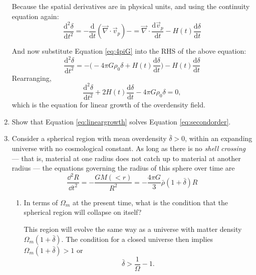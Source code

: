\begin{enumerate}
\begin{answer}
Because the spatial derivatives are in physical units, and using the
continuity equation again:
\begin{equation}
\frac{\mathrm{d}^2\delta}{\mathrm{d} t^2} =
- \frac{\mathrm{d}}{\mathrm{d}t} \left(\vec{\nabla} \cdot \vec{v}_p\right)
- = \vec{\nabla} \cdot \frac{\mathrm{d}\vec{v}_p}{\mathrm{d} t} - H(t) \frac{\mathrm{d}\delta}{\mathrm{d} t} 
\end{equation}

And now substitute Equation \ref{eq:4piG} into the RHS of the above equation:
\begin{equation}
\frac{\mathrm{d}^2\delta}{\mathrm{d} t^2} = -\Bigg(-4\pi G \rho_0 \delta + H(t) \frac{\mathrm{d}\delta}{\mathrm{d} t}\Bigg) - H(t) \frac{\mathrm{d}\delta}{\mathrm{d} t} 
\end{equation}
Rearranging,
\begin{equation}
\frac{\mathrm{d}^2\delta}{\mathrm{d} t^2} +
2H(t) \frac{\mathrm{d}\delta}{\mathrm{d} t} - 4\pi G \rho_0 \delta =
0,
\end{equation}
which is the equation for linear growth of the overdensity field.
\end{answer}

\item Show that Equation \ref{eq:lineargrowth} solves
Equation \ref{eq:secondorder}.
\item Consider a spherical region with mean overdensity $\bar\delta
>0$, within an expanding universe with no cosmological constant. As
 long as there is no {\it shell crossing} --- that is, material at one
 radius does not catch up to material at another radius --- the
 equations governing the radius of this sphere over time are
 \begin{equation}
\frac{\dd^2 R}{\dd t^2} = - \frac{GM(<r)}{R^2} = - \frac{4\pi
 G}{3} \bar\rho(1+\bar\delta) R
 \end{equation}
\begin{enumerate}
\item In terms of $\Omega_m$ at the present time, what is the
condition that the spherical region will collapse on itself?

\begin{answer}
This region will evolve the same way as a universe with
matter density $\Omega_m(1+\bar\delta)$. The condition for a closed
universe then implies $\Omega_m(1+\bar\delta)>1$ or
\begin{equation}
\bar\delta > \frac{1}{\Omega} -1.
\end{equation}
\end{answer}


\end{enumerate}
\end{enumerate}

